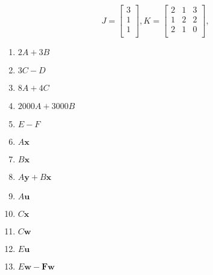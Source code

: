 \documentclass[11pt,a4paper,titlepage,oneside,openany]{article}
\numberwithin{equation}{section}
\numberwithin{algorithm}{section}
\numberwithin{figure}{section}
\numberwithin{table}{section}
\renewcommand{\vec}[1]{\mathbf{#1}}
\begin{document}
\begin{enumerate}
\begin{equation*}
		\end{equation*}
		\begin{equation*}
		J=\left[ \begin{array}{c}
		3\\
		1\\
		1\\ \end{array}\right],
		K=\left[ \begin{array}{ccc}
		2 & 1 & 3\\1 & 2 & 2\\2 & 1 & 0\\\end{array}\right], 
		\end{equation*}
		\begin{multicols}{3}
			\begin{enumerate}
				\item $2A+3B$
				\item $3C-D$
				\item $8A+4C$
				\item $2000A+3000B$
				\item $E-F$
				\item $A\vec{x}$
				\item $B\vec{x}$
				\item $A\vec{y}+B\vec{x}$
				\item $A\vec{u}$
				\item $C\vec{x}$
				\item $C\vec{w}$
				\item $E\vec{u}$
				\item $E\vec{w}-\vec{F}\vec{w}$
				
			\end{enumerate}
		\end{multicols}
		
	\end{enumerate}
\end{document}
